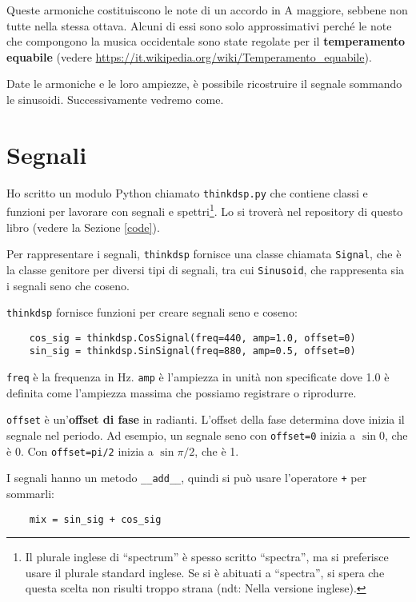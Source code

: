 \documentclass[12pt,a4paper]{book}
\begin{document}
Queste armoniche costituiscono le note di un accordo in A maggiore, sebbene non tutte nella stessa ottava. Alcuni di essi sono solo approssimativi perché le note che compongono la musica occidentale sono state regolate per il {\bf temperamento equabile} (vedere \url{https://it.wikipedia.org/wiki/Temperamento_equabile}).

Date le armoniche e le loro ampiezze, è possibile ricostruire il segnale sommando le sinusoidi. Successivamente vedremo come.

\section{Segnali} 

Ho scritto un modulo Python chiamato {\tt thinkdsp.py} che contiene classi e funzioni per lavorare con segnali e spettri\footnote{Il plurale inglese di ``spectrum'' è spesso scritto ``spectra'', ma si preferisce usare il plurale standard inglese. Se si è abituati a ``spectra'', si spera che questa scelta non risulti troppo strana (ndt: Nella versione inglese).}. Lo si troverà nel repository di questo libro (vedere la Sezione \ref{code}).

Per rappresentare i segnali, {\tt thinkdsp} fornisce una classe chiamata {\tt Signal}, che è la classe genitore per diversi tipi di segnali, tra cui {\tt Sinusoid}, che rappresenta sia i segnali seno che coseno.

{\tt thinkdsp} fornisce funzioni per creare segnali seno e coseno:

\begin{verbatim} 
    cos_sig = thinkdsp.CosSignal(freq=440, amp=1.0, offset=0)
    sin_sig = thinkdsp.SinSignal(freq=880, amp=0.5, offset=0)
 \end{verbatim} 

{\tt freq} è la frequenza in Hz. {\tt amp} è l'ampiezza in unità non specificate dove 1.0 è definita come l'ampiezza massima che possiamo registrare o riprodurre.

{\tt offset} è un'{\bf offset di fase} in radianti. L'offset della fase determina dove inizia il segnale nel periodo. Ad esempio, un segnale seno con {\tt offset=0} inizia a $\sin 0$, che è 0. Con {\tt offset=pi/2} inizia a $\sin \pi/2$, che è 1.

I segnali hanno un metodo \verb"__add__", quindi si può usare l'operatore {\tt +} per sommarli:

\begin{verbatim} 
    mix = sin_sig + cos_sig
 \end{verbatim} 
\end{document}
